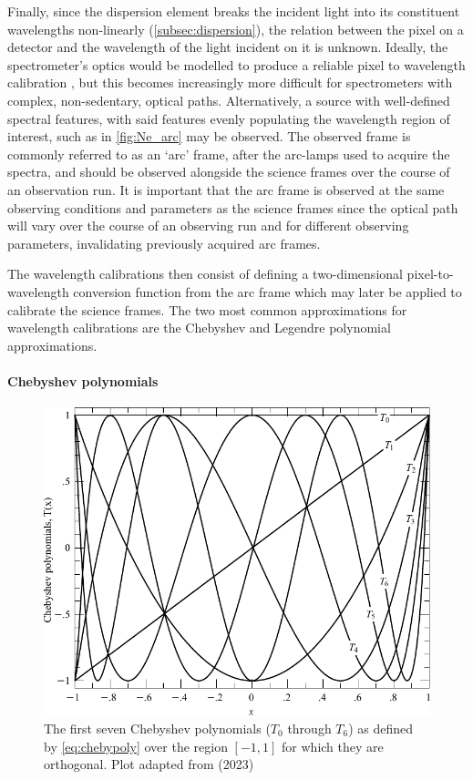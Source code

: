 Finally, since the dispersion element breaks the incident light into its constituent wavelengths non-linearly (\autoref{subsec:dispersion}), the relation between the pixel on a detector and the wavelength of the light incident on it is unknown. Ideally, the spectrometer's optics would be modelled to produce a reliable pixel to wavelength calibration \citep[see E.g.][]{WavCalSpectraModel}, but this becomes increasingly more difficult for spectrometers with complex, non-sedentary, optical paths. Alternatively, a source with well-defined spectral features, with said features evenly populating the wavelength region of interest, such as in \autoref{fig:Ne_arc} may be observed. The observed frame is commonly referred to as an `arc' frame, after the arc-lamps used to acquire the spectra, and should be observed alongside the science frames over the course of an observation run. It is important that the arc frame is observed at the same observing conditions and parameters as the science frames since the optical path will vary over the course of an observing run and for different observing parameters, invalidating previously acquired arc frames.

The wavelength calibrations then consist of defining a two-dimensional pixel-to-wave\-length conversion function from the arc frame which may later be applied to calibrate the science frames. The two most common approximations for wavelength calibrations are the Chebyshev and Legendre polynomial approximations.

\paragraph{Chebyshev polynomials}

\begin{figure}[t]
    \centering
    \includegraphics[width = 12cm]{figures/2_chebyshev.pdf}
    \caption{The first seven Chebyshev polynomials ($T_0$ through $T_{6}$) as defined by \autoref{eq:chebypoly} over the region $[-1, 1]$ for which they are orthogonal. Plot adapted from \citep{numerical_recipes} (2023)\protect\footnotemark}
    \label{fig:chebyshev}
\end{figure}

